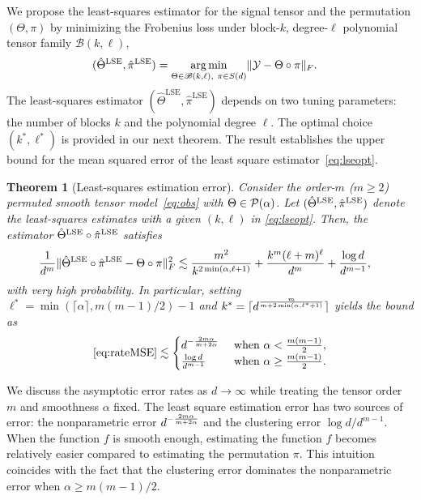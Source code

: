 \documentclass{article}
\newtheorem{thm}{Theorem}
\theoremstyle{definition}
\def\caliB{\mathscr{B}}
\begin{document}
We propose the least-squares estimator for the signal tensor and the permutation $(\Theta,\pi)$ by minimizing the Frobenius loss under block-$k$, degree-$\ell$ polynomial tensor family $\caliB(k,\ell)$, 
\begin{align}\label{eq:lseopt}
    (\hat\Theta^{\text{LSE}},\hat \pi^{\text{LSE}}) &= \argmin_{\Theta\in\caliB(k,\ell), \  \pi\in S(d)}\FnormSize{}{\tY-\Theta\circ\pi}.
\end{align}
The least-squares estimator $(\hat\Theta^{\text{LSE}},\hat\pi^{\text{LSE}})$ depends on two tuning parameters: the number of blocks $k$ and the polynomial degree $\ell$. The optimal choice $(k^*,\ell^*)$ is provided in our next theorem. The result establishes the upper bound for the mean squared error of the least square estimator~\eqref{eq:lseopt}. 
\begin{thm}[Least-squares estimation error]\label{thm:LSE} 
Consider the order-$m$ ($m\geq 2$) permuted smooth tensor model~\eqref{eq:obs} with $\Theta\in\mathcal{P}(\alpha)$.
Let $(\hat\Theta^{\textup{LSE}},\hat\pi^{\textup{LSE}})$ denote the least-squares estimates with a given $(k,\ell)$ in \eqref{eq:lseopt}. Then, the estimator $\hat\Theta^{\textup{LSE}}\circ\hat\pi^{\textup{LSE}}$ satisfies 
\begin{align}\label{eq:rateMSE}
    \frac{1}{d^m}&\lVert\hat\Theta^{\textup{LSE}}\circ\hat\pi^{\textup{LSE}}-\Theta\circ \pi\rVert_F^2\lesssim  \frac{m^2}{k^{2\min(\alpha,\ell+1)}}+ \frac{k^m(\ell+m)^\ell}{d^m}+\frac{\log d}{d^{m-1}},
\end{align}
with very high probability.
In particular, setting $\ell^* = \min(\lceil\alpha\rceil,m(m-1)/2)-1 $ and $k^* = \lceil d^{m\over m+2\min(\alpha,\ell^*+1)}\rceil$ yields the bound as 
\begin{align}\label{eq:rates}
     \eqref{eq:rateMSE}\lesssim \begin{cases}d^{-{2m\alpha\over m+2\alpha}} & \text{ when } \alpha < \frac{m(m-1)}{2},\\{\log d\over d^{m-1}}&\text{ when } \alpha \geq \frac{m(m-1)}{2}.\end{cases}
\end{align}
\end{thm}
We discuss the asymptotic error rates as $d\rightarrow \infty$ while treating the tensor order $m$ and smoothness $\alpha$ fixed. 
The least square estimation error has two sources of error: the nonparametric error $d^{-{2m\alpha\over m+2\alpha}}$ and the clustering error $\log d/d^{m-1}$.  When the function $f$ is smooth enough, estimating the function $f$ becomes relatively easier compared to estimating the permutation $\pi$. This intuition coincides with the fact that the clustering error dominates the nonparametric error when  $\alpha\geq m(m-1)/2$. 
\end{document}
